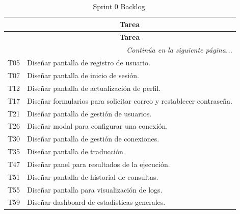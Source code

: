 \begin{longtable}[c]{|c|m{}|}
    \caption{Sprint 0 Backlog.}
    \label{tab:sprintBacklog0} \\
    
    \hline
    \rowcolor{gray!50}
    \multicolumn{1}{|c|}{\textbf{Código}} & \multicolumn{1}{c|}{\textbf{Tarea}} \\
    \hline
    \endfirsthead

    \hline
    \rowcolor{gray!50}
    \multicolumn{1}{|c|}{\textbf{Código}} & \multicolumn{1}{c|}{\textbf{Tarea}} \\
    \hline
    \endhead

    \multicolumn{2}{r}{\textit{Continúa en la siguiente página...}} \\
    \endfoot
    
    \endlastfoot

    T05 & Diseñar pantalla de registro de usuario. \\
    \hline
    T07 & Diseñar pantalla de inicio de sesión. \\
    \hline
    T12 & Diseñar pantalla de actualización de perfil. \\
    \hline
    T17 & Diseñar formularios para solicitar correo y restablecer contraseña. \\
    \hline
    T21 & Diseñar pantalla de gestión de usuarios. \\
    \hline
    T26 & Diseñar modal para configurar una conexión. \\
    \hline
    T30 & Diseñar pantalla de gestión de conexiones. \\
    \hline
    T35 & Diseñar pantalla de traducción. \\
    \hline
    T47 & Diseñar panel para resultados de la ejecución. \\
    \hline
    T51 & Diseñar pantalla de historial de consultas. \\
    \hline
    T55 & Diseñar pantalla para visualización de logs. \\
    \hline
    T59 & Diseñar dashboard de estadísticas generales. \\
    \hline
\end{longtable}